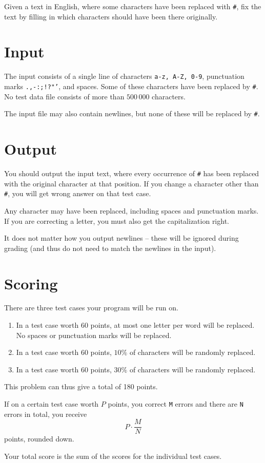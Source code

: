 
Given a text in English, where some characters have been replaced with \texttt{\#}, fix the text by filling in which characters should have been there originally.

\section*{Input}
The input consists of a single line of characters \texttt{a-z, A-Z, 0-9}, punctuation marks \texttt{.,-:;!?"'}, and spaces. Some of these characters have been replaced by \texttt{\#}.
No test data file consists of more than $500\,000$ characters.

The input file may also contain newlines, but none of these will be replaced by \texttt{\#}.

\section*{Output}
You should output the input text, where every occurrence of \texttt{\#} has been replaced with the original character at that position. If you change a character other than \texttt{\#}, you will get wrong answer on that test case.

Any character may have been replaced, including spaces and punctuation marks. If you are correcting a letter, you must also get the capitalization right.

It does not matter how you output newlines -- these will be ignored during grading (and thus do not need to match the newlines in the input).

\section*{Scoring}

There are three test cases your program will be run on.
\begin{enumerate}
  \item In a test case worth 60 points, at most one letter per word will be replaced. No spaces or punctuation marks will be replaced.
  \item In a test case worth 60 points, $10\%$ of characters will be randomly replaced.
  \item In a test case worth 60 points, $30\%$ of characters will be randomly replaced.
\end{enumerate}

This problem can thus give a total of 180 points.

If on a certain test case worth $P$ points, you correct \texttt{M} errors and there are \texttt{N} errors in total, you receive
$$P \cdot \frac{M}{N}$$
points, rounded down.

Your total score is the sum of the scores for the individual test cases.
